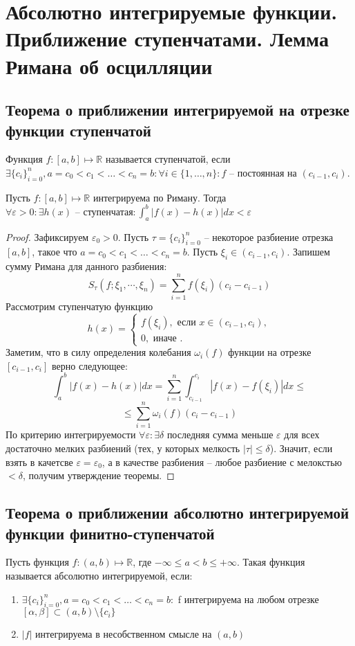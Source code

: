 \documentclass[document.tex]{subfiles}
\begin{document}
\section{Абсолютно интегрируемые функции. Приближение ступенчатами. Лемма Римана об осцилляции}
\subsection{Теорема о приближении интегрируемой на отрезке функции ступенчатой}
\begin{definition}
Функция $f: [a, b] \mapsto \mathbb{R}$ называется ступенчатой, если $\exists \{c_i\}_{i=0}^n,
a = c_0 < c_1 < \ldots < c_n = b: \forall i \in \{1, \ldots, n\}: f\text{ -- постоянная на }(c_{i-1}, c_i)$.
\end{definition}

\begin{theorem}
Пусть $f : [a, b] \mapsto \mathbb{R}$ интегрируема по Риману. Тогда $\forall \varepsilon > 0: \exists h(x)\text{ -- ступенчатая} : \int_a^b|f(x)-h(x)|dx < \varepsilon$
\end{theorem}
\begin{proof}
    Зафиксируем $\varepsilon_0 > 0$.
Пусть $\tau = \{c_i\}_{i=0}^n$ -- некоторое разбиение отрезка $[a, b]$, такое что $a = c_0 < c_1 < \ldots < c_n = b$. Пусть $\xi_i \in (c_{i - 1}, c_i)$. Запишем сумму Римана для данного разбиения:
$$S_{\tau}(f; \xi_1, \cdots, \xi_n) = \sum_{i=1}^n f(\xi_i)(c_i - c_{i-1})$$
Рассмотрим ступенчатую функцию
 $$h(x) = \begin{cases}
 	f(\xi_i),\text{ если } x \in (c_{i-1}, c_i),\\
 	0, \text{ иначе }.
\end{cases}$$
Заметим, что в силу определения колебания $\omega_i(f)$ функции на отрезке $[c_{i - 1}, c_i]$ верно следующее:
$$\int_a^b|f(x)-h(x)|dx = \sum_{i=1}^n\int_{c_{i-1}}^{c_i}|f(x) - f(\xi_i)|dx \leq$$
$$\leq \sum_{i=1}^n\omega_i(f)(c_i - c_{i-1})$$
По критерию интегрируемости $\forall \varepsilon : \exists \delta$ последняя сумма меньше $\varepsilon$ для всех достаточно мелких
разбиений (тех, у которых мелкость $|\tau| \leq \delta$). Значит, если взять в качетсве $\varepsilon = \varepsilon_0$, а
в качестве разбиения -- любое разбиение с мелокстью $< \delta$, получим утверждение теоремы. 
\end{proof}

\subsection{Теорема о приближении абсолютно интегрируемой функции финитно-ступенчатой}
\begin{definition}
Пусть функция $f: (a, b) \mapsto \mathbb{R}$, где $-\infty \leq a < b \leq +\infty$. Такая функция называется абсолютно интегрируемой, если:
\begin{enumerate}
\item $\exists \{c_i\}_{i=0}^n, a = c_0 < c_1 < \ldots < c_n = b:$ f интегрируема на любом отрезке $[\alpha, \beta] \subset (a, b) \setminus \{c_i\}$
\item $|f|$ интегрируема в несобственном смысле на $(a, b)$
\end{enumerate}
\end{definition}
\end{document}
